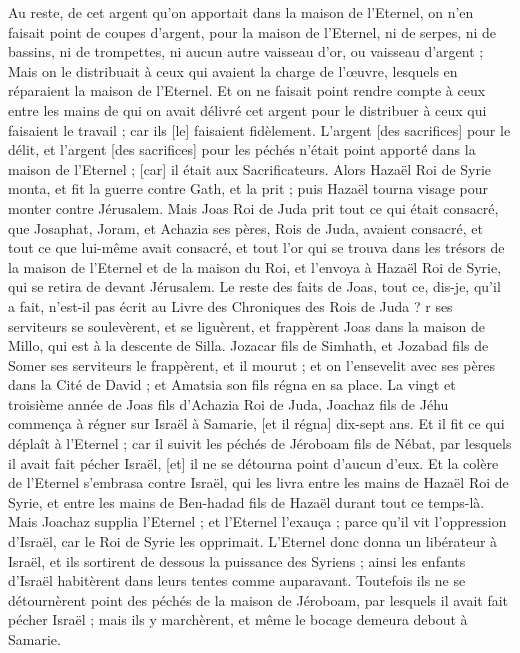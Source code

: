 \begin{multicols}{2}
Au reste, de cet argent qu'on apportait dans la maison de l'Eternel, on n'en faisait point de coupes d'argent, pour la maison de l'Eternel, ni de serpes, ni de bassins, ni de trompettes, ni aucun autre vaisseau d'or, ou vaisseau d'argent ;
Mais on le distribuait à ceux qui avaient la charge de l'œuvre, lesquels en réparaient la maison de l'Eternel.
Et on ne faisait point rendre compte à ceux entre les mains de qui on avait délivré cet argent pour le distribuer à ceux qui faisaient le travail ; car ils [le] faisaient fidèlement.
L'argent [des sacrifices] pour le délit, et l'argent [des sacrifices] pour les péchés n'était point apporté dans la maison de l'Eternel ; [car] il était aux Sacrificateurs.
Alors Hazaël Roi de Syrie monta, et fit la guerre contre Gath, et la prit ; puis Hazaël tourna visage pour monter contre Jérusalem.
Mais Joas Roi de Juda prit tout ce qui était consacré, que Josaphat, Joram, et Achazia ses pères, Rois de Juda, avaient consacré, et tout ce que lui-même avait consacré, et tout l'or qui se trouva dans les trésors de la maison de l'Eternel et de la maison du Roi, et l'envoya à Hazaël Roi de Syrie, qui se retira de devant Jérusalem.
Le reste des faits de Joas, tout ce, dis-je, qu'il a fait, n'est-il pas écrit au Livre des Chroniques des Rois de Juda ?
r ses serviteurs se soulevèrent, et se liguèrent, et frappèrent Joas dans la maison de Millo, qui est à la descente de Silla.
Jozacar fils de Simhath, et Jozabad fils de Somer ses serviteurs le frappèrent, et il mourut ; et on l'ensevelit avec ses pères dans la Cité de David ; et Amatsia son fils régna en sa place.
\VerseOne{}La vingt et troisième année de Joas fils d'Achazia Roi de Juda, Joachaz fils de Jéhu commença à régner sur Israël à Samarie, [et il régna] dix-sept ans.
Et il fit ce qui déplaît à l'Eternel ; car il suivit les péchés de Jéroboam fils de Nébat, par lesquels il avait fait pécher Israël, [et] il ne se détourna point d'aucun d'eux.
Et la colère de l'Eternel s'embrasa contre Israël, qui les livra entre les mains de Hazaël Roi de Syrie, et entre les mains de Ben-hadad fils de Hazaël durant tout ce temps-là.
Mais Joachaz supplia l'Eternel ; et l'Eternel l'exauça ; parce qu'il vit l'oppression d'Israël, car le Roi de Syrie les opprimait.
L'Eternel donc donna un libérateur à Israël, et ils sortirent de dessous la puissance des Syriens ; ainsi les enfants d'Israël habitèrent dans leurs tentes comme auparavant.
Toutefois ils ne se détournèrent point des péchés de la maison de Jéroboam, par lesquels il avait fait pécher Israël ; mais ils y marchèrent, et même le bocage demeura debout à Samarie.

\end{multicols}
